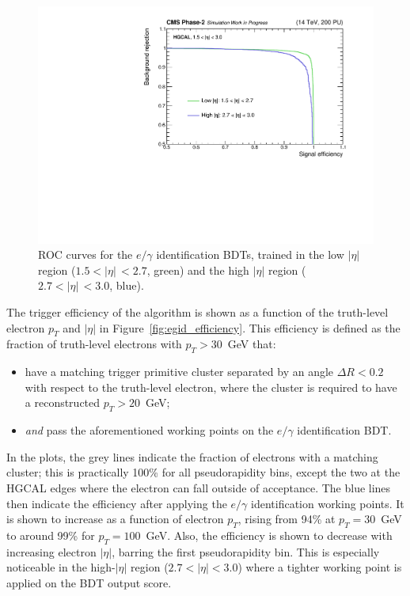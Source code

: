 \begin{figure}[t!]
  \centering
  \includegraphics[width=.7\textwidth]{Figures/cms/egid/ROC.pdf}
  \caption[$e/\gamma$ identification ROC curve]
  {
    ROC curves for the $e/\gamma$ identification BDTs, trained in the low $|\eta|$ region (${1.5<|\eta|\,<2.7}$, green) and the high $|\eta|$ region ($2.7<|\eta|\,<3.0$, blue).
  }
  \label{fig:egid_roc}
\end{figure}
\FloatBarrier

The trigger efficiency of the algorithm is shown as a function of the truth-level electron $p_T$ and $|\eta|$ in Figure~\ref{fig:egid_efficiency}. This efficiency is defined as the fraction of truth-level electrons with $p_T>30$~GeV that:
\begin{itemize}
    \item have a matching trigger primitive cluster separated by an angle $\Delta R<0.2$ with respect to the truth-level electron, where the cluster is required to have a reconstructed $p_T>20$~GeV;
    \item \textit{and} pass the aforementioned working points on the $e/\gamma$ identification BDT.
\end{itemize}
\noindent
In the plots, the grey lines indicate the fraction of electrons with a matching cluster; this is practically 100\% for all pseudorapidity bins, except the two at the HGCAL edges where the electron can fall outside of acceptance. The blue lines then indicate the efficiency after applying the $e/\gamma$ identification working points. It is shown to increase as a function of electron $p_T$, rising from 94\% at $p_T=30$~GeV to around 99\% for $p_T=100$~GeV. Also, the efficiency is shown to decrease with increasing electron $|\eta|$, barring the first pseudorapidity bin. This is especially noticeable in the high-$|\eta|$ region ($2.7<|\eta|<3.0$) where a tighter working point is applied on the BDT output score.

